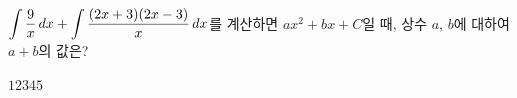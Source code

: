 $\displaystyle\int \dfrac{9}{x}\mkern3mu dx+\int \dfrac{(2x+3)(2x-3)}{x}\mkern3mu dx$를 계산하면 $ax^2+bx+C$일 때, 상수 $a$, $b$에 대하여 $a+b$의 값은? 
\begin{choices32}{$1$}{$2$}{$3$}{$4$}{$5$}\end{choices32}
